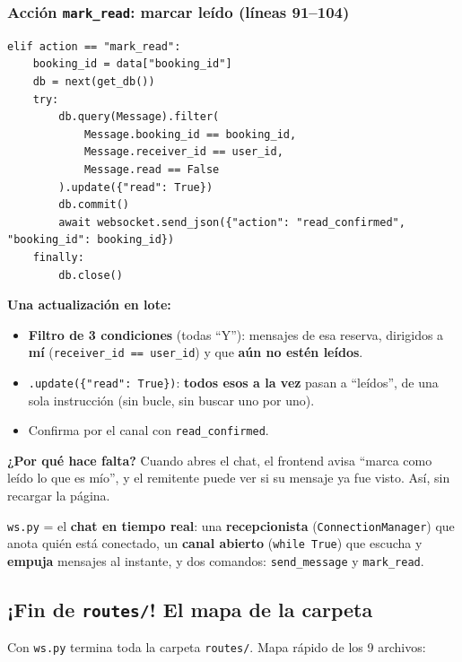 \documentclass[11pt,a4paper]{article}
\begin{document}
\subsubsection{Acción \texttt{mark\_read}: marcar leído (líneas 91--104)}

\begin{lstlisting}
elif action == "mark_read":
    booking_id = data["booking_id"]
    db = next(get_db())
    try:
        db.query(Message).filter(
            Message.booking_id == booking_id,
            Message.receiver_id == user_id,
            Message.read == False
        ).update({"read": True})
        db.commit()
        await websocket.send_json({"action": "read_confirmed", "booking_id": booking_id})
    finally:
        db.close()
\end{lstlisting}

\textbf{Una actualización en lote:}
\begin{itemize}
    \item \textbf{Filtro de 3 condiciones} (todas ``Y''): mensajes de esa reserva, dirigidos a
    \textbf{mí} (\texttt{receiver\_id == user\_id}) y que \textbf{aún no estén leídos}.
    \item \texttt{.update(\{"read": True\})}: \textbf{todos esos a la vez} pasan a
    ``leídos'', de una sola instrucción (sin bucle, sin buscar uno por uno).
    \item Confirma por el canal con \texttt{read\_confirmed}.
\end{itemize}

\textbf{¿Por qué hace falta?} Cuando abres el chat, el frontend avisa ``marca como leído lo que
es mío'', y el remitente puede ver si su mensaje ya fue visto. Así, sin recargar la página.

\begin{recuadro}
\texttt{ws.py} = el \textbf{chat en tiempo real}: una \textbf{recepcionista}
(\texttt{ConnectionManager}) que anota quién está conectado, un \textbf{canal abierto}
(\texttt{while True}) que escucha y \textbf{empuja} mensajes al instante, y dos comandos:
\texttt{send\_message} y \texttt{mark\_read}.
\end{recuadro}

\subsection{¡Fin de \texttt{routes/}! El mapa de la carpeta}

Con \texttt{ws.py} termina toda la carpeta \texttt{routes/}. Mapa rápido de los 9 archivos:
\end{document}
